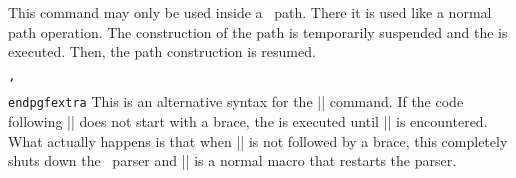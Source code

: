 \begin{command}{\pgfextra{}}
  This command may only be used inside a \tikzname\ path. There it is
  used like a normal path operation. The construction of the path is
  temporarily suspended and the  is executed. Then, the
  path construction is resumed.

\begin{codeexample}[]
\newdimen\mydim
\begin{tikzpicture}
  \mydim=1cm
  \draw (0pt,\mydim) \pgfextra{\mydim=2cm} -- (0pt,\mydim);
\end{tikzpicture}
\end{codeexample}
\end{command}

\begin{command}{\pgfextra {} \texttt{\char`\\endpgfextra}}
  This is an alternative syntax for the |\pgfextra| command. If the
  code following |\pgfextra| does not start with a brace, the
   is executed until |\endpgfextra| is encountered. What
  actually happens is that when |\pgfextra| is not followed by a
  brace, this completely shuts down the \tikzname\ parser and
  |\endpgfextra| is a normal macro that restarts the parser.

\begin{codeexample}[]
\newdimen\mydim
\begin{tikzpicture}
  \mydim=1cm
  \draw (0pt,\mydim)
    \pgfextra \mydim=2cm \endpgfextra -- (0pt,\mydim);
\end{tikzpicture}
\end{codeexample}
\end{command}

